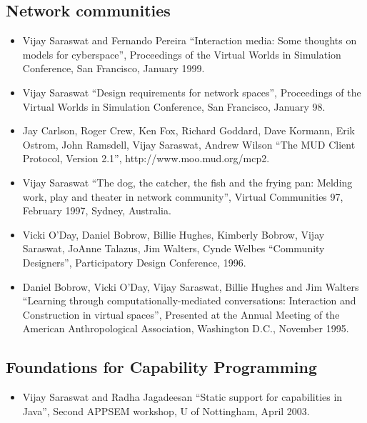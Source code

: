 \documentclass{article}
\begin{document}
\subsection*{Network communities}
\begin{itemize}
\item Vijay Saraswat and Fernando Pereira ``Interaction media: Some
  thoughts on models for cyberspace'', Proceedings of the Virtual
  Worlds in Simulation Conference, San Francisco, January 1999.

\item  Vijay Saraswat ``Design requirements for network spaces'',
  Proceedings of the Virtual Worlds in Simulation Conference, San
  Francisco, January 98.

\item Jay Carlson, Roger Crew, Ken Fox, Richard Goddard, Dave Kormann,
  Erik Ostrom, John Ramsdell, Vijay Saraswat, Andrew Wilson ``The MUD
  Client Protocol, Version 2.1'', http://www.moo.mud.org/mcp2.

\item  Vijay Saraswat ``The dog, the catcher, the fish and the
  frying pan: Melding work, play and theater in network
  community'', Virtual Communities 97, February 1997, Sydney,
  Australia. 
  
\item  Vicki O'Day, Daniel Bobrow, Billie Hughes, Kimberly Bobrow,
  Vijay Saraswat, JoAnne Talazus, Jim Walters, Cynde Welbes
  ``Community Designers'', Participatory Design Conference, 1996.

\item  Daniel Bobrow, Vicki O'Day, Vijay Saraswat, Billie Hughes and
  Jim Walters ``Learning through computationally-mediated
  conversations: Interaction and Construction in virtual
  spaces'', Presented at the Annual Meeting of the American
  Anthropological Association, Washington D.C., November 1995.
\end{itemize}
\subsection*{Foundations for Capability Programming}

\begin{itemize} 
\item Vijay Saraswat and Radha Jagadeesan ``Static support for
  capabilities in Java'', Second APPSEM workshop, U of Nottingham,
  April 2003.
\end{itemize}
\end{document}
